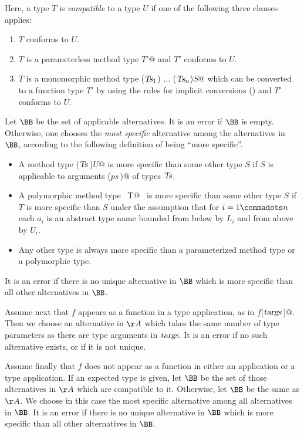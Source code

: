 \documentclass[a4paper,12pt,twoside,titlepage]{book}
\newcommand{\targs}{\mbox{\sl targs}}
\newcommand{\Ts}{\mbox{\sl Ts}}
\begin{document}
Here, a type $T$ is {\em compatible} to a type $U$ if one of the
following three clauses applies:
\begin{enumerate}
\item
$T$ conforms to $U$.
\item
$T$ is a parameterless method type \lstinline@[]$T'$@ and $T'$
conforms to $U$.
\item 
$T$ is a monomorphic method type \lstinline@($\Ts_1$) $\ldots$ ($\Ts_n$)$S$@ which
can be converted to a function type $T'$ by using the rules for
implicit conversions () and $T'$ conforms to
$U$.
\end{enumerate}

Let $\BB$ be the set of applicable alternatives. It is an error if
$\BB$ is empty. Otherwise, one chooses the {\em most specific}
alternative among the alternatives in $\BB$, according to the
following definition of being ``more specific''.
\begin{itemize} 
\item
A method type \lstinline@($\Ts\,$)$U$@ is more specific than some other
type $S$ if $S$ is applicable to arguments \lstinline@($ps\,$)@ of
types $\Ts$.
\item
A polymorphic method type
~\lstinline@[$a_1$ >: $L_1$ <: $U_1 \commadots a_n$ >: $L_n$ <: $U_n$]T@~ is
more specific than some other type $S$ if $T$ is more
specific than $S$ under the assumption that for
$i = 1 \commadots n$ each $a_i$ is an abstract type name
bounded from below by $L_i$ and from above by $U_i$.
\item
Any other type is always more specific than a parameterized method
type or a polymorphic type.
\end{itemize}
It is an error if there is no unique alternative in $\BB$ which is
more specific than all other alternatives in $\BB$.

Assume next that $f$ appears as a function in a type
application, as in \lstinline@$f$[$\targs\,$]@. Then we choose an alternative in
$\AA$ which takes the same number of type parameters as there are
type arguments in $\targs$. It is an error if no such alternative
exists, or if it is not unique.

Assume finally that $f$ does not appear as a function in either
an application or a type application. If an expected type is given,
let $\BB$ be the set of those alternatives in $\AA$ which are
compatible to it. Otherwise, let $\BB$ be the same as $\AA$.
We choose in this case the most specific alternative among all
alternatives in $\BB$. It is an error if there is no unique
alternative in $\BB$ which is more specific than all other
alternatives in $\BB$.
\end{document}
